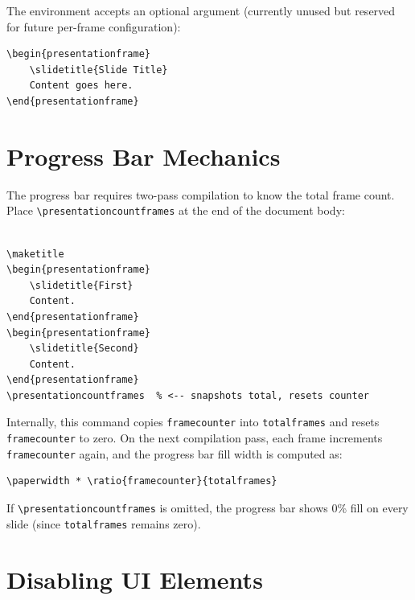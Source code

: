 The environment accepts an optional argument (currently unused but reserved
for future per-frame configuration):

\begin{verbatim}
\begin{presentationframe}
    \slidetitle{Slide Title}
    Content goes here.
\end{presentationframe}
\end{verbatim}

\section{Progress Bar Mechanics}

The progress bar requires two-pass compilation to know the total frame count.
Place \texttt{\textbackslash presentationcountframes} at the end of the
document body:

\begin{verbatim}

\maketitle
\begin{presentationframe}
    \slidetitle{First}
    Content.
\end{presentationframe}
\begin{presentationframe}
    \slidetitle{Second}
    Content.
\end{presentationframe}
\presentationcountframes  % <-- snapshots total, resets counter

\end{verbatim}

Internally, this command copies \texttt{framecounter} into
\texttt{totalframes} and resets \texttt{framecounter} to zero.  On the next
compilation pass, each frame increments \texttt{framecounter} again, and the
progress bar fill width is computed as:

\begin{verbatim}
\paperwidth * \ratio{framecounter}{totalframes}
\end{verbatim}

If \texttt{\textbackslash presentationcountframes} is omitted, the progress
bar shows 0\% fill on every slide (since \texttt{totalframes} remains zero).

\section{Disabling UI Elements}


